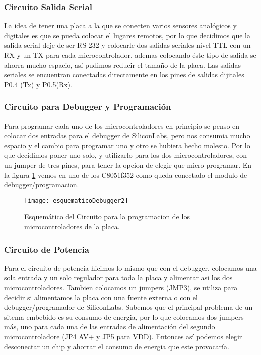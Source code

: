 
\subsubsection{Circuito Salida Serial}
\label{subsub:salida_serial2}

La idea de tener una placa a la que se conecten varios sensores analógicos y digitales es que se pueda colocar el lugares remotos, por lo que decidimos que la salida serial deje de ser RS-232 y colocarle dos salidas seriales nivel TTL con un RX y un TX para cada microcontrolador, ademas colocando éste tipo de salida se ahorra mucho espacio, así pudimos reducir el tamaño de la placa. Las salidas seriales se encuentran conectadas directamente en los pines de salidas dijitales P0.4 (Tx) y P0.5(Rx).


\subsubsection{Circuito para Debugger y Programación} %
\label{subsub:debugger_programacion2}

Para programar cada uno de los microcontroladores en principio se penso en colocar dos entradas para el debugger de SiliconLabs, pero nos consumia mucho espacio y el cambio para programar uno y otro se hubiera hecho molesto. Por lo que decidimos poner uno solo, y utilizarlo para los dos microcontroladores, con un jumper de tres pines, para tener la opcion de elegir que micro programar.
En la figura \ref{fig:esquematicoDebugger2} vemos en uno de los C8051f352 como queda conectado el modulo de debugger/programacion.

\begin{figure}	
\centering
  \texttt{[image: esquematicoDebugger2]}
  \caption{Esquemático del Circuito para la programacion de los microcontroladores de la placa.}\label{fig:esquematicoDebugger2}
\end{figure}



\subsubsection{Circuito de Potencia}
\label{subsub: circuito_potencia2}

Para el circuito de potencia hicimos lo mismo que con el debugger, colocamos una sola entrada y un solo regulador para toda la placa y alimentar asi los dos microcontroladores. Tambien colocamos un jumpers (JMP3), se utiliza para decidir si alimentamos la placa con una fuente externa o con el debugger/programador de SiliconLabs. 
Sabemos que el principal problema de un sitema embebido es su consumo de energia, por lo que colocamos dos jumpers más, uno para cada una de las entradas de alimentación del segundo microcontroladore (JP4 AV+ y JP5 para VDD). Entonces así podemos elegir desconectar un chip y ahorrar el consumo de energia que este provocaría. 

